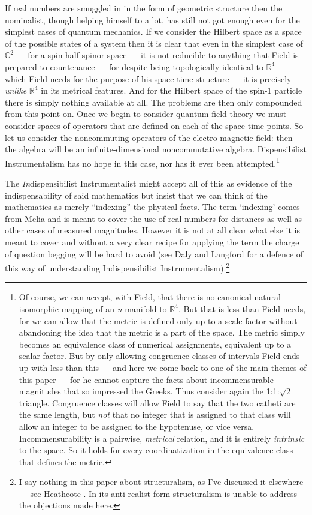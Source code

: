 \documentclass[11pt,oneside,a4paper]{article}
\newcommand*{\sqrtwo}{\ensuremath{\sqrt{2}}\hspace{0.5ex}\xspace}
\begin{document}
If real numbers are smuggled in in the form of geometric structure then the nominalist, though helping himself to a lot, has still not got enough even for the simplest cases of quantum mechanics. If we consider the Hilbert space as a space of the possible states of a system then it is clear that even in the simplest case of $\mathbb{C}^{2}$ --- for a spin-half spinor space --- it is not reducible to anything that Field is prepared to countenance --- for despite being topologically identical to $\mathbb{R}^{4}$ --- which Field needs for the purpose of his space-time structure --- it is precisely \textit{unlike} $\mathbb{R}^{4}$ in its metrical features. And for the Hilbert space of the spin-1 particle there is simply nothing available at all. The problems are then only compounded from this point on. Once we begin to consider quantum field theory we must consider spaces of operators that are defined on each of the space-time points. So let us consider the noncommuting operators of the electro-magnetic field: then the algebra will be an infinite-dimensional noncommutative algebra. Dispensibilist Instrumentalism has no hope in this case, nor has it ever been attempted.\footnote{Of course, we can accept, with Field, that there is no canonical natural isomorphic mapping of an \textit{n}-manifold to $\mathbb{R}^{4}$. But that is less than Field needs, for we can allow that the metric is defined only up to a scale factor without abandoning the idea that the metric is a part of the space. The metric simply becomes an equivalence class of numerical assignments, equivalent up to a scalar factor. But by only allowing congruence classes of intervals Field ends up with less than this --- and here we come back to one of the main themes of this paper --- for he cannot capture the  facts about incommensurable magnitudes that so impressed the Greeks. Thus consider again the 1:1:\sqrtwo triangle. Congruence classes will allow Field to say that the two catheti are the same length, but \textit{not} that no integer that is assigned to that class will allow an integer to be assigned to the hypotenuse, or vice versa. Incommensurability is a pairwise, \textit{metrical} relation, and it is entirely \textit{intrinsic} to the space. So it holds for every coordinatization in the equivalence class that defines the metric.}

The \textit{In}dispensibilist Instrumentalist might accept all of this as evidence of the indispensability of said mathematics but insist that we can think of the mathematics as merely ``indexing'' the physical facts. The term `indexing' comes from Melia \parencite*{melia_weaseling_2000} and is meant to cover the use of real numbers for distances as well as other cases of measured magnitudes. However it is not at all clear what else it is meant to cover and without a very clear recipe for applying the term the charge of question begging will be hard to avoid (see Daly and Langford \parencite*{daly_mathematical_2009} for a defence of this way of understanding Indispensibilist Instrumentalism).\footnote{I say nothing in this paper about structuralism, as I've discussed it elsewhere --- see Heathcote \parencite*{heathcote_exhaustion_2014}. In its anti-realist form structuralism is unable to address the objections made here.}
\end{document}

